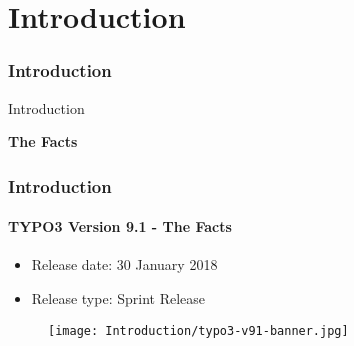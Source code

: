 %

\section{Introduction}
\begin{frame}[fragile]
	\frametitle{Introduction}

	\begin{center}\huge{Introduction}\end{center}
	\begin{center}\huge{\color{typo3darkgrey}\textbf{The Facts}}\end{center}

\end{frame}

\begin{frame}[fragile]
	\frametitle{Introduction}
	\framesubtitle{TYPO3 Version 9.1 - The Facts}

	\begin{itemize}
		\item Release date: 30 January 2018
		\item Release type: Sprint Release
	\end{itemize}

	\begin{figure}
		\texttt{[image: Introduction/typo3-v91-banner.jpg]}
	\end{figure}

\end{frame}

